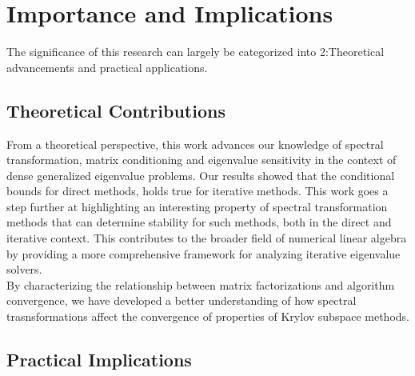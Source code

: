 \section{Importance and Implications}
The significance of this research can largely be categorized into 2:Theoretical advancements and practical applications.

\subsection{Theoretical Contributions}
From a theoretical perspective, this work advances our knowledge of spectral transformation, matrix conditioning and eigenvalue sensitivity in the context of dense generalized eigenvalue problems. Our results showed that the conditional bounds for direct methods, holds true for iterative methods. This work goes a step further at highlighting an interesting property of spectral transformation methods that can determine stability for such methods, both in the direct and iterative context. This contributes to the broader field of numerical linear algebra by providing a more comprehensive framework for analyzing iterative eigenvalue solvers.\\

By characterizing the relationship between matrix factorizations and algorithm convergence, we have developed a better understanding of how spectral trasnsformations affect the convergence of properties of Krylov subspace methods.

\subsection{Practical Implications}
